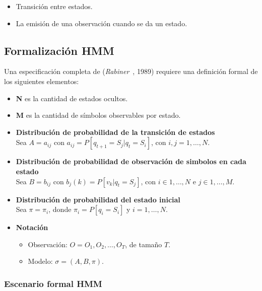 \begin{itemize}
	\menorEspacioItemize
	\item Transición entre estados.
	\item La emisión de una observación cuando se da un estado.
\end{itemize}



\subsection{Formalización HMM}
Una especificación completa de \HMM (\emph{Rabiner}~\cite{Rabiner1990}, 1989) requiere una definición formal de los siguientes elementos:


\begin{itemize}
	\menorEspacioItemize
	\item \textbf{N} es la cantidad de estados ocultos.
 	\item \textbf{M} es la cantidad de símbolos observables por estado.
	\item \textbf{Distribución de probabilidad de la transición de estados}\\
	Sea $A={a_{ij}}$ con $a_{ij} = P[q_{t+1}=S_{j} | q_t = S_i  ]$, con $i,j = 1,\dots,N$.

	\item \textbf{Distribución de probabilidad de observación de simbolos  en cada estado} \\
	Sea $B={b_{ij}}$ con $b_{j}(k) = P[v_{k}  | q_t = S_j ]$, con $i \in {1,\dots, N}$ e $j \in {1,\dots, M}$.

	\item \textbf{Distribución de probabilidad del estado inicial}\\
	Sea $\pi = {\pi_{i}}$, donde  $\pi_{i} = P[q_i=S_i] $ y $i=1,\dots,N$.
	\item \textbf{Notación}
		\begin{itemize}
			\menorEspacioItemize
			\item Observación: $O = O_{1},O_{2},\dots ,O_{T}$, de tamaño $T$.
			\item Modelo: $\sigma = (A,B, \pi)$.
		\end{itemize}


\end{itemize}






\subsubsection{Escenario formal HMM}

